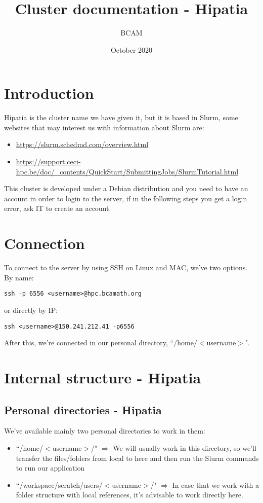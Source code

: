 \documentclass[a4paper]{article}
\title{Cluster documentation - Hipatia}
\date{October  2020}
\author{BCAM}
\begin{document}
	\maketitle
	\tableofcontents
	\section{Introduction}
		Hipatia is the cluster name we have given it, but it is based in Slurm, some websites that may interest us with information about Slurm are:
		\begin{itemize}
			\item \url{https://slurm.schedmd.com/overview.html}
			\item \url{https://support.ceci-hpc.be/doc/_contents/QuickStart/SubmittingJobs/SlurmTutorial.html}
		\end{itemize}
		This cluster is developed under a Debian distribution and you need to have an account in order to login to the server, if in the following steps you get a login error, ask IT to create an account.
	\section{Connection}
		To connect to the server by using SSH on Linux and MAC, we've two options.\\
		By name:
		\begin{lstlisting}[caption=Connection Hipatia, label=lst:connectionHipatia]
			ssh -p 6556 <username>@hpc.bcamath.org
		\end{lstlisting}
		or directly by IP:\\
		\begin{lstlisting}[caption=Connection Hipatia, label=lst:connectionHipatia]
			ssh <username>@150.241.212.41 -p6556
		\end{lstlisting}
		After this, we're connected in our personal directory, ``/home/$<$username$>$".\\
		
	\section{Internal structure - Hipatia}
		\subsection{Personal directories - Hipatia}
			We've available mainly two personal directories to work in them:
			\begin{itemize}
				\item ``/home/$<$username$>$/" $\Rightarrow$ We will usually work in this directory, so we'll transfer the files/folders from local to here and then run the Slurm commands to run our application
				\item ``/workspace/scratch/users/$<$username$>$/" $\Rightarrow$ In case that we work with a folder structure with local references, it's advisable to work directly here.
			\end{itemize} 
\end{document}
